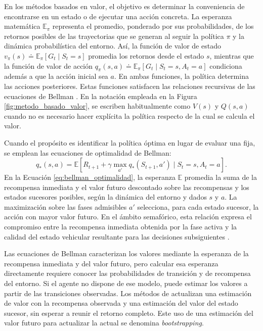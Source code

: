 En los métodos basados en valor, el objetivo es determinar la conveniencia de encontrarse en un estado o de ejecutar una acción concreta. La esperanza matemática $\mathbb{E}_\pi$ representa el promedio, ponderado por sus probabilidades, de los retornos posibles de las trayectorias que se generan al seguir la política $\pi$ y la dinámica probabilística del entorno. Así, la función de valor de estado $v_\pi(s) \doteq \mathbb{E}_\pi[G_t \mid S_t = s]$ promedia los retornos desde el estado $s$, mientras que la función de valor de acción $q_\pi(s, a) \doteq \mathbb{E}_\pi[G_t \mid S_t = s, A_t = a]$ condiciona además a que la acción inicial sea $a$. En ambas funciones, la política determina las acciones posteriores. Estas funciones satisfacen las relaciones recursivas de las ecuaciones de Bellman \cite{suttonRL}. En la notación empleada en la Figura \ref{fig:metodo_basado_valor}, se escriben habitualmente como $V(s)$ y $Q(s,a)$ cuando no es necesario hacer explícita la política respecto de la cual se calcula el valor.

Cuando el propósito es identificar la política óptima en lugar de evaluar una fija, se emplean las ecuaciones de optimalidad de Bellman:
\begin{equation}
    q_*(s,a) = \mathbb{E}\left[R_{t+1} + \gamma \max_{a'} q_*(S_{t+1},a') \mid S_t=s,A_t=a\right].
    \label{eq:bellman_optimalidad}
\end{equation}
En la Ecuación \eqref{eq:bellman_optimalidad}, la esperanza $\mathbb{E}$ promedia la suma de la recompensa inmediata y el valor futuro descontado sobre las recompensas y los estados sucesores posibles, según la dinámica del entorno y dados $s$ y $a$. La maximización sobre las fases admisibles $a'$ selecciona, para cada estado sucesor, la acción con mayor valor futuro. En el ámbito semafórico, esta relación expresa el compromiso entre la recompensa inmediata obtenida por la fase activa y la calidad del estado vehicular resultante para las decisiones subsiguientes \cite{suttonRL}.

Las ecuaciones de Bellman caracterizan los valores mediante la esperanza de la recompensa inmediata y del valor futuro, pero calcular esa esperanza directamente requiere conocer las probabilidades de transición y de recompensa del entorno. Si el agente no dispone de ese modelo, puede estimar los valores a partir de las transiciones observadas. Los métodos de  actualizan una estimación de valor con la recompensa observada y una estimación del valor del estado sucesor, sin esperar a reunir el retorno completo. Este uso de una estimación del valor futuro para actualizar la actual se denomina \textit{bootstrapping}.

